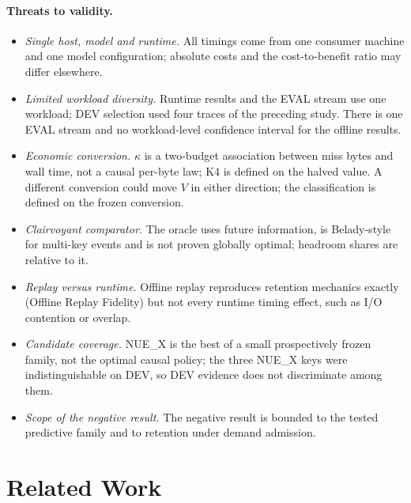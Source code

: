 \documentclass[11pt]{article}
\theoremstyle{plain}
\theoremstyle{definition}
\begin{document}
\paragraph{Threats to validity.}
\begin{itemize}
\item \emph{Single host, model and runtime.} All timings come from one consumer machine and one model configuration; absolute costs and the cost-to-benefit ratio may differ elsewhere.
\item \emph{Limited workload diversity.} Runtime results and the EVAL stream use one workload; DEV selection used four traces of the preceding study. There is one EVAL stream and no workload-level confidence interval for the offline results.
\item \emph{Economic conversion.} $\kappa$ is a two-budget association between miss bytes and wall time, not a causal per-byte law; K4 is defined on the halved value. A different conversion could move $V$ in either direction; the classification is defined on the frozen conversion.
\item \emph{Clairvoyant comparator.} The oracle uses future information, is Belady-style for multi-key events and is not proven globally optimal; headroom shares are relative to it.
\item \emph{Replay versus runtime.} Offline replay reproduces retention mechanics exactly (Offline Replay Fidelity) but not every runtime timing effect, such as I/O contention or overlap.
\item \emph{Candidate coverage.} NUE\_X is the best of a small prospectively frozen family, not the optimal causal policy; the three NUE\_X keys were indistinguishable on DEV, so DEV evidence does not discriminate among them.
\item \emph{Scope of the negative result.} The negative result is bounded to the tested predictive family and to retention under demand admission.
\end{itemize}

\section{Related Work}
\label{sec:related}
\end{document}
